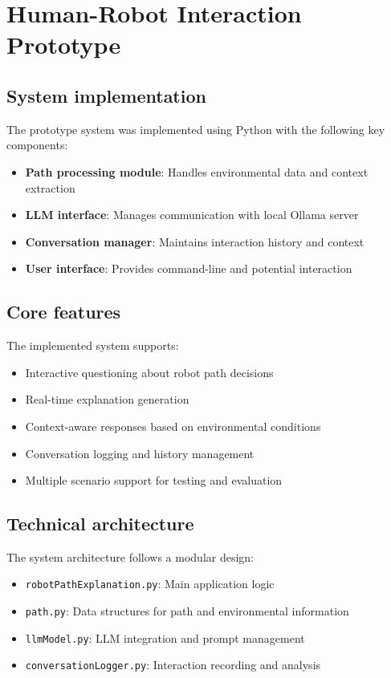 \section{Human-Robot Interaction Prototype}

\subsection{System implementation}

The prototype system was implemented using Python with the following key components:
\begin{itemize}
    \item \textbf{Path processing module}: Handles environmental data and context extraction
    \item \textbf{LLM interface}: Manages communication with local Ollama server
    \item \textbf{Conversation manager}: Maintains interaction history and context
    \item \textbf{User interface}: Provides command-line and potential interaction
\end{itemize}

\subsection{Core features}

The implemented system supports:
\begin{itemize}
    \item Interactive questioning about robot path decisions
    \item Real-time explanation generation
    \item Context-aware responses based on environmental conditions
    \item Conversation logging and history management
    \item Multiple scenario support for testing and evaluation
\end{itemize}

\subsection{Technical architecture}

The system architecture follows a modular design:
\begin{itemize}
    \item \texttt{robotPathExplanation.py}: Main application logic
    \item \texttt{path.py}: Data structures for path and environmental information
    \item \texttt{llmModel.py}: LLM integration and prompt management
    \item \texttt{conversationLogger.py}: Interaction recording and analysis
\end{itemize}

